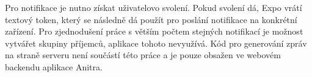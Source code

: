 Pro notifikace je nutno získat uživatelovo svolení. Pokud svolení dá, Expo vrátí textový token, který se následně dá použít pro poslání notifikace na konkrétní zařízení. Pro zjednodušení práce s větším počtem stejných notifikací je možnost vytvářet skupiny příjemců, aplikace tohoto nevyužívá. Kód pro generování zpráv na straně serveru není součástí této práce a je pouze obsažen ve webovém backendu aplikace Anitra.
